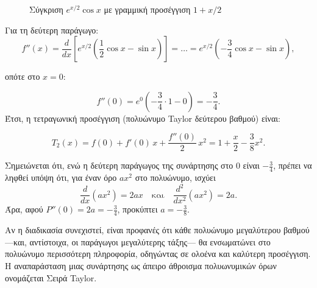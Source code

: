 \documentclass[
  a4paper,
  11pt,
]{article}
\begin{document}
\begin{figure}[htbp]
\centering
{}
\caption{Σύγκριση $e^{x/2}\cos x$ με γραμμική προσέγγιση $1+x/2$}
\label{fig:expcoslinear}
\end{figure}

Για τη δεύτερη παράγωγο: \[
f''(x) = \frac{d}{dx} \left[ e^{x/2} \left( \frac{1}{2}\cos x - \sin x \right) \right] 
= \dots 
= e^{x/2} \left( -\frac{3}{4}\cos x - \sin x \right),
\]

οπότε στο \(x=0\):

\[
f''(0) = e^{0} \left( -\frac{3}{4} \cdot 1 - 0 \right) = -\frac{3}{4}.
\] Έτσι, η τετραγωνική προσέγγιση (πολυώνυμο Taylor δεύτερου βαθμού)
είναι:

\[
\boxed{T_2(x) = f(0) + f'(0)\,x + \frac{f''(0)}{2}\,x^2 = 1 + \frac{x}{2} - \frac{3}{8}x^2}.
\]

Σημειώνεται ότι, ενώ η δεύτερη παράγωγος της συνάρτησης στο \(0\) είναι
\(-\frac{3}{4}\), πρέπει να ληφθεί υπόψη ότι, για έναν όρο \(a x^2\) στο
πολυώνυμο, ισχύει \[
\frac{d}{dx}(a x^2)=2ax \quad \text{και} \quad \frac{d^2}{dx^2}(a x^2)=2a.
\] Άρα, αφού \(P''(0)=2a=-\frac{3}{4}\), προκύπτει \(a=-\frac{3}{8}\).

Αν η διαδικασία συνεχιστεί, είναι προφανές ότι κάθε πολυώνυμο
μεγαλύτερου βαθμού ---και, αντίστοιχα, οι παράγωγοι μεγαλύτερης τάξης---
θα ενσωματώνει στο πολυώνυμο περισσότερη πληροφορία, οδηγώντας σε ολοένα
και καλύτερη προσέγγιση. Η αναπαράσταση μιας συνάρτησης ως άπειρο
άθροισμα πολυωνυμικών όρων ονομάζεται Σειρά Taylor.
\end{document}
